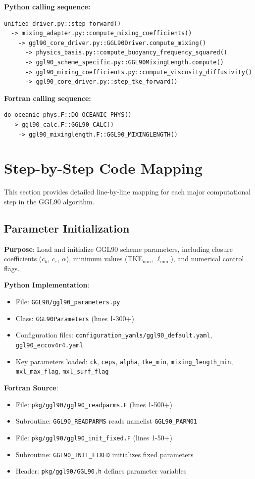 \documentclass[11pt]{article}
\begin{document}
\textbf{Python calling sequence:}
\begin{verbatim}
unified_driver.py::step_forward()
  -> mixing_adapter.py::compute_mixing_coefficients()
    -> ggl90_core_driver.py::GGL90Driver.compute_mixing()
      -> physics_basis.py::compute_buoyancy_frequency_squared()
      -> ggl90_scheme_specific.py::GGL90MixingLength.compute()
      -> ggl90_mixing_coefficients.py::compute_viscosity_diffusivity()
      -> ggl90_core_driver.py::step_tke_forward()
\end{verbatim}

\textbf{Fortran calling sequence:}
\begin{verbatim}
do_oceanic_phys.F::DO_OCEANIC_PHYS()
  -> ggl90_calc.F::GGL90_CALC()
    -> ggl90_mixinglength.F::GGL90_MIXINGLENGTH()
\end{verbatim}

\section{Step-by-Step Code Mapping}
\label{sec:mapping}

This section provides detailed line-by-line mapping for each major computational step in the GGL90 algorithm.

\subsection{Parameter Initialization}

\textbf{Purpose}: Load and initialize GGL90 scheme parameters, including closure coefficients ($c_k$, $c_\varepsilon$, $\alpha$), minimum values (TKE$_{\min}$, $\ell_{\min}$), and numerical control flags.

\textbf{Python Implementation}:
\begin{itemize}
    \item File: \verb|GGL90/ggl90_parameters.py|
    \item Class: \verb|GGL90Parameters| (lines 1-300+)
    \item Configuration files: \verb|configuration_yamls/ggl90_default.yaml|, \verb|ggl90_eccov4r4.yaml|
    \item Key parameters loaded: \verb|ck|, \verb|ceps|, \verb|alpha|, \verb|tke_min|, \verb|mixing_length_min|, \verb|mxl_max_flag|, \verb|mxl_surf_flag|
\end{itemize}

\textbf{Fortran Source}:
\begin{itemize}
    \item File: \verb|pkg/ggl90/ggl90_readparms.F| (lines 1-500+)
    \item Subroutine: \verb|GGL90_READPARMS| reads namelist \verb|GGL90_PARM01|
    \item File: \verb|pkg/ggl90/ggl90_init_fixed.F| (lines 1-50+)
    \item Subroutine: \verb|GGL90_INIT_FIXED| initializes fixed parameters
    \item Header: \verb|pkg/ggl90/GGL90.h| defines parameter variables
\end{itemize}
\end{document}
